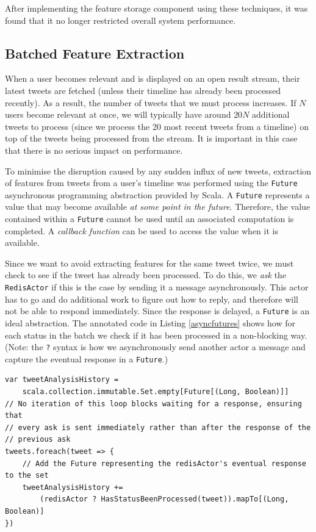 \documentclass{l4proj}
\newcommand{\code}[1]{\texttt{#1}}
\begin{document}
        
        After implementing the feature storage component using these techniques, it was found that it no longer restricted overall system performance.
        
        \subsection{Batched Feature Extraction}
        When a user becomes relevant and is displayed on an open result stream, their latest tweets are fetched (unless their timeline has already been processed recently). As a result, the number of tweets that we must process increases. If $N$ users become relevant at once, we will typically have around $20N$ additional tweets to process  (since we process the 20 most recent tweets from a timeline) on top of the tweets being processed from the stream. It is important in this case that there is no serious impact on performance.
        
        To minimise the disruption caused by any sudden influx of new tweets, extraction of features from tweets from a user's timeline was performed using the \code{Future} asynchronous programming abstraction provided by Scala. A \code{Future} represents a value that may become available \textit{at some point in the future}. Therefore, the value contained within a \code{Future} cannot be used until an associated computation is completed. A \textit{callback function} can be used to access the value when it is available.
        
        Since we want to avoid extracting features for the same tweet twice, we must check to see if the tweet has already been processed. To do this, we \textit{ask} the \code{RedisActor} if this is the case by sending it a message asynchronously. This actor has to go and do additional work to figure out how to reply, and therefore will not be able to respond immediately. Since the response is delayed, a \code{Future} is an ideal abstraction. The annotated code in Listing \ref{asyncfutures} shows how for each status in the batch we check if it has been processed in a non-blocking way. (Note: the \code{?} syntax is how we asynchronously send another actor a message and capture the eventual response in a \code{Future}.)
        
\begin{lstlisting}[caption=Check asynchronously whether a status has already been processed.,label=asyncfutures]
var tweetAnalysisHistory = 
    scala.collection.immutable.Set.empty[Future[(Long, Boolean)]]
// No iteration of this loop blocks waiting for a response, ensuring that
// every ask is sent immediately rather than after the response of the 
// previous ask
tweets.foreach(tweet => {
    // Add the Future representing the redisActor's eventual response to the set
    tweetAnalysisHistory += 
        (redisActor ? HasStatusBeenProcessed(tweet)).mapTo[(Long, Boolean)]
})
\end{lstlisting}
        
\end{document}
